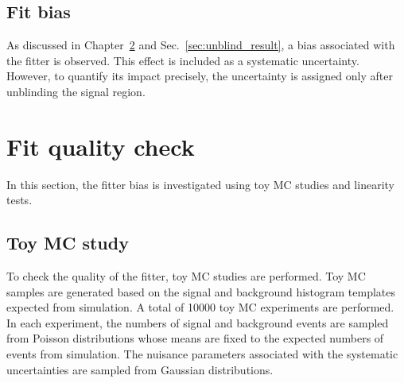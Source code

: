 \section{Fit bias}
As discussed in Chapter~\ref{chapter:fit_quality} and Sec.~\ref{sec:unblind_result}, a bias associated with the fitter is observed.
This effect is included as a systematic uncertainty.
However, to quantify its impact precisely, the uncertainty is assigned only after unblinding the signal region.

\chapter{Fit quality check}
\label{chapter:fit_quality}
In this section, the fitter bias is investigated using toy MC studies and linearity tests.

\section{Toy MC study}
To check the quality of the fitter, toy MC studies are performed.
Toy MC samples are generated based on the signal and background histogram templates expected from simulation.
A total of 10000 toy MC experiments are performed.
In each experiment, the numbers of signal and background events are sampled from Poisson distributions whose means are fixed to the expected numbers of events from simulation.
The nuisance parameters associated with the systematic uncertainties are sampled from Gaussian distributions.

